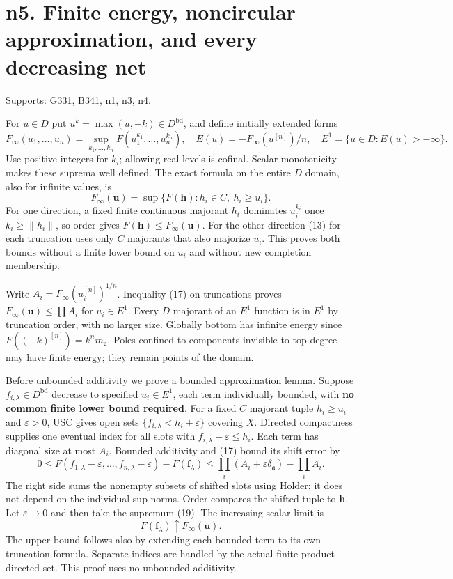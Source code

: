 \documentclass[
  11pt,
]{article}
\begin{document}
\section{n5. Finite energy, noncircular approximation, and every
decreasing
net}\label{n5.-finite-energy-noncircular-approximation-and-every-decreasing-net}

Supports: G331, B341, n1, n3, n4.

For \(u\in D\) put \(u^k=\max(u,-k)\in D^{\mathrm{bd}}\), and define
initially extended forms
\[F_\infty(u_1,\ldots,u_n)=\sup_{k_1,\ldots,k_n}F(u_1^{k_1},\ldots,u_n^{k_n}),\quad E(u)=-F_\infty(u^{[n]})/n,\quad E^1=\{u\in D:E(u)>-\infty\}.\tag{18}\]
Use positive integers for \(k_i\); allowing real levels is cofinal.
Scalar monotonicity makes these suprema well defined. The exact formula
on the entire \(D\) domain, also for infinite values, is
\[F_\infty(\boldsymbol u)=\sup\{F(\boldsymbol h):h_i\in C,\ h_i\ge u_i\}.\tag{19}\]
For one direction, a fixed finite continuous majorant \(h_i\) dominates
\(u_i^{k_i}\) once \(k_i\ge\|h_i\|\), so order gives
\(F(\boldsymbol h)\le F_\infty(\boldsymbol u)\). For the other direction
(13) for each truncation uses only \(C\) majorants that also majorize
\(u_i\). This proves both bounds without a finite lower bound on \(u_i\)
and without new completion membership.

Write \(A_i=F_\infty(u_i^{[n]})^{1/n}\). Inequality (17) on truncations
proves \(F_\infty(\boldsymbol u)\le\prod A_i\) for \(u_i\in E^1\). Every
\(D\) majorant of an \(E^1\) function is in \(E^1\) by truncation order,
with no larger size. Globally bottom has infinite energy since
\(F((-k)^{[n]})=k^n m_{\mathfrak a}\). Poles confined to components
invisible to top degree may have finite energy; they remain points of
the domain.

Before unbounded additivity we prove a bounded approximation lemma.
Suppose \(f_{i,\lambda}\in D^{\mathrm{bd}}\) decrease to specified
\(u_i\in E^1\), each term individually bounded, with \textbf{no common
finite lower bound required}. For a fixed \(C\) majorant tuple
\(h_i\ge u_i\) and \(\varepsilon>0\), USC gives open sets
\(\{f_{i,\lambda}<h_i+\varepsilon\}\) covering \(X\). Directed
compactness supplies one eventual index for all slots with
\(f_{i,\lambda}-\varepsilon\le h_i\). Each term has diagonal size at
most \(A_i\). Bounded additivity and (17) bound its shift error by
\[0\le F(f_{1,\lambda}-\varepsilon,\ldots,f_{n,\lambda}-\varepsilon)-F(\boldsymbol f_\lambda)\le\prod_i(A_i+\varepsilon\delta_{\mathfrak a})-\prod_i A_i.\tag{20}\]
The right side sums the nonempty subsets of shifted slots using Holder;
it does not depend on the individual sup norms. Order compares the
shifted tuple to \(\boldsymbol h\). Let \(\varepsilon\to0\) and then
take the supremum (19). The increasing scalar limit is
\[F(\boldsymbol f_\lambda)\uparrow F_\infty(\boldsymbol u).\tag{21}\]
The upper bound follows also by extending each bounded term to its own
truncation formula. Separate indices are handled by the actual finite
product directed set. This proof uses no unbounded additivity.
\end{document}

